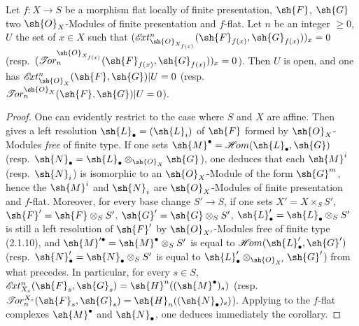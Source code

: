 \begin{corollary}[12.3.4]
\label{IV.12.3.4}
Let $f:X\to S$ be a morphism flat locally of finite presentation, $\sh{F}$, $\sh{G}$ two $\sh{O}_X$-Modules of finite presentation and $f$-flat.
Let $n$ be an integer $\geq 0$, $U$ the set of $x\in X$ such that $(\mathscr{E}\!xt^n_{\sh{O}_{X_{f(x)}}}(\sh{F}_{f(x)},\sh{G}_{f(x)}))_x=0$ (resp.\ $(\mathscr{T}\!or_n^{\sh{O}_{X_{f(x)}}}(\sh{F}_{f(x)},\sh{G}_{f(x)}))_x=0$).
Then $U$ is open, and one has $\mathscr{E}\!xt^n_{\sh{O}_X}(\sh{F},\sh{G})|U=0$ (resp.\ $\mathscr{T}\!or_n^{\sh{O}_X}(\sh{F},\sh{G})|U=0$).
\end{corollary}

\begin{proof}
One can evidently restrict to the case where $S$ and $X$ are affine.
Then  gives a left resolution $\sh{L}_\bullet=(\sh{L}_i)$ of $\sh{F}$ formed by $\sh{O}_X$-Modules \emph{free} of finite type.
If one sets $\sh{M}^\bullet=\mathscr{H}\!om(\sh{L}_\bullet,\sh{G})$ (resp.\ $\sh{N}_\bullet=\sh{L}_\bullet\otimes_{\sh{O}_X}\sh{G}$), one deduces that each $\sh{M}^i$ (resp.\ $\sh{N}_i$) is isomorphic to an $\sh{O}_X$-Module of the form $\sh{G}^m$, hence the $\sh{M}^i$ and $\sh{N}_i$ are $\sh{O}_X$-Modules of finite presentation and $f$-flat.
Moreover, for every base change $S'\to S$, if one sets $X'=X\times_S S'$, $\sh{F}'=\sh{F}\otimes_S S'$, $\sh{G}'=\sh{G}\otimes_S S'$, $\sh{L}'_\bullet=\sh{L}_\bullet\otimes_S S'$ is still a left resolution of $\sh{F}'$ by $\sh{O}_{X'}$-Modules free of finite type (2.1.10), and $\sh{M}'^\bullet=\sh{M}^\bullet\otimes_S S'$ is equal to $\mathscr{H}\!om(\sh{L}'_\bullet,\sh{G}')$ (resp.\ $\sh{N}'_\bullet=\sh{N}_\bullet\otimes_S S'$ is equal to $\sh{L}'_\bullet\otimes_{\sh{O}_{X'}}\sh{G}'$) from what precedes.
In particular, for every $s\in S$, $\mathscr{E}\!xt^n_{X_s}(\sh{F}_s,\sh{G}_s)=\sh{H}^n((\sh{M}^\bullet)_s)$ (resp.\ $\mathscr{T}\!or_n^{X_s}(\sh{F}_s,\sh{G}_s)=\sh{H}_n((\sh{N}_\bullet)_s)$).
Applying  to the $f$-flat complexes $\sh{M}^\bullet$ and $\sh{N}_\bullet$, one deduces immediately the corollary.
\end{proof}
